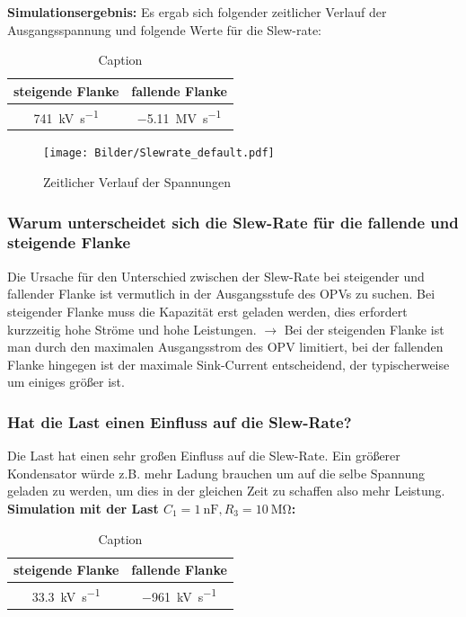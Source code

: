\textbf{Simulationsergebnis:} Es ergab sich folgender zeitlicher Verlauf der Ausgangsspannung und folgende Werte für die Slew-rate:

\begin{table}[H]
    \centering
    \begin{tabular}{|c|c|}
    \hline
         steigende Flanke & fallende Flanke  \\ \hline
         \SI{741}{\kilo \volt \per \second} & \SI{-5.11}{\mega \volt \per \second} \\ \hline
    \end{tabular}
    \caption{Caption}
    \label{tab:my_label}
\end{table}
\begin{figure}[H]
    \centering
    \texttt{[image: Bilder/Slewrate\_default.pdf]}
    \caption{Zeitlicher Verlauf der Spannungen}
\end{figure}

\subsubsection{Warum unterscheidet sich die Slew-Rate für die fallende und steigende Flanke}

Die Ursache für den Unterschied zwischen der Slew-Rate bei steigender und fallender Flanke ist vermutlich in der Ausgangsstufe des OPVs zu suchen. Bei steigender Flanke muss die Kapazität erst geladen werden, dies erfordert kurzzeitig hohe Ströme und hohe Leistungen. $\rightarrow$ Bei der steigenden Flanke ist man durch den maximalen Ausgangsstrom des OPV limitiert, bei der fallenden Flanke hingegen ist der maximale Sink-Current entscheidend, der typischerweise um einiges größer ist.

\subsubsection{Hat die Last einen Einfluss auf die Slew-Rate?}

Die Last hat einen sehr großen Einfluss auf die Slew-Rate. Ein größerer Kondensator würde z.B. mehr Ladung brauchen um auf die selbe Spannung geladen zu werden, um dies in der gleichen Zeit zu schaffen also mehr Leistung.\\

\textbf{Simulation mit der Last $C_1 = \SI{1}{\nano \farad}, R_3 = \SI{10}{\mega \ohm}$:}

\begin{table}[H]
    \centering
    \begin{tabular}{|c|c|}
    \hline
         steigende Flanke & fallende Flanke  \\ \hline
         \SI{33.3}{\kilo \volt \per \second} & \SI{-961}{\kilo \volt \per \second} \\ \hline
    \end{tabular}
    \caption{Caption}
    \label{tab:my_label}
\end{table}

